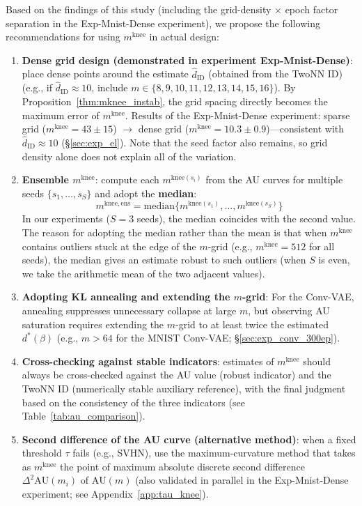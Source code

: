 \documentclass[make,article,submit,pdftex,moreauthors]{Definitions/mdpi}
\newcommand{\mknee}{m^{\mathrm{knee}}}
\begin{document}
Based on the findings of this study (including the grid-density $\times$ epoch factor
separation in the Exp-Mnist-Dense experiment), we propose the following recommendations
for using $\mknee$ in actual design:
\begin{enumerate}
  \item \textbf{Dense grid design (demonstrated in experiment Exp-Mnist-Dense)}: place
        dense points around the estimate $\hat{d}_\mathrm{ID}$ (obtained from the TwoNN ID)
        (e.g., if $\hat{d}_\mathrm{ID} \approx 10$, include $m \in \{8,9,10,11,12,13,14,15,16\}$).
        By Proposition~\ref{thm:mknee_instab}, the grid spacing directly becomes the
        maximum error of $\mknee$.
        Results of the Exp-Mnist-Dense experiment: sparse grid ($\mknee=43\pm15$) $\to$
        dense grid ($\mknee=10.3\pm0.9$)---consistent with $\hat{d}_\mathrm{ID} \approx 10$
        (\S\ref{sec:exp_el}).
        Note that the seed factor also remains, so grid density alone does not explain
        all of the variation.
  \item \textbf{Ensemble $\mknee$}: compute each $m^{\mathrm{knee}(s_i)}$ from the AU
        curves for multiple seeds $\{s_1,\ldots,s_S\}$ and adopt the \textbf{median}:
        \begin{equation}
          m^{\mathrm{knee,ens}} = \mathrm{median}\bigl\{m^{\mathrm{knee}(s_1)}, \ldots, m^{\mathrm{knee}(s_S)}\bigr\}
          \label{eq:mknee_ens}
        \end{equation}
        In our experiments ($S=3$ seeds), the median coincides with the second value.
        The reason for adopting the median rather than the mean is that when $\mknee$
        contains outliers stuck at the edge of the $m$-grid (e.g., $\mknee=512$ for all
        seeds), the median gives an estimate robust to such outliers (when $S$ is even,
        we take the arithmetic mean of the two adjacent values).
  \item \textbf{Adopting KL annealing and extending the $m$-grid}: For the Conv-VAE,
        annealing suppresses unnecessary collapse at large $m$, but observing AU
        saturation requires extending the $m$-grid to at least twice the estimated
        $d^*(\beta)$ (e.g., $m > 64$ for the MNIST Conv-VAE; \S\ref{sec:exp_conv_300ep}).
  \item \textbf{Cross-checking against stable indicators}: estimates of $\mknee$ should
        always be cross-checked against the AU value (robust indicator) and the TwoNN ID
        (numerically stable auxiliary reference), with the final judgment based on the
        consistency of the three indicators (see Table~\ref{tab:au_comparison}).
  \item \textbf{Second difference of the AU curve (alternative method)}: when a fixed
        threshold $\tau$ fails (e.g., SVHN), use the maximum-curvature method that takes
        as $\mknee$ the point of maximum absolute discrete second difference
        $\Delta^2\mathrm{AU}(m_i)$ of $\mathrm{AU}(m)$ (also validated in parallel in the
        Exp-Mnist-Dense experiment; see Appendix~\ref{app:tau_knee}).
\end{enumerate}
\end{document}
